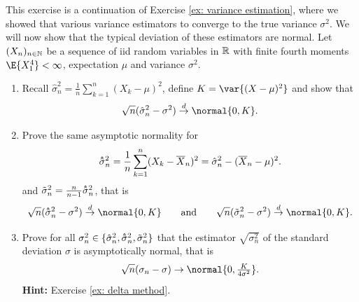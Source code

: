 
\begin{exercise}[subtitle={Normality of variance estimation \Coffeecup \Coffeecup}]
    This exercise is a continuation of Exercise \ref{ex: variance estimation},
    where we showed that various variance estimators to converge
    to the true variance \(\sigma^2\). We will now show that the typical
    deviation of these estimators are normal.
    Let \((X_n)_{n\in \mathbb{N}}\) be a sequence of iid random variables in \(\mathbb{R}\)
    with finite fourth moments \(\E{X_1^4} < \infty\), expectation \(\mu\) and variance \(\sigma^2\).
    \begin{enumerate}[label=(\alph*), noitemsep]
        \item\label{it: (normality of variance estimation) theoretical estimator}
        Recall \(\hat\sigma_n^2 = \frac1n \sum_{k=1}^n (X_k - \mu)^2\), define \(K = \var{(X-\mu)^2}\) and show that
        \[
            \sqrt{n}(\hat\sigma_n^2 - \sigma^2) \overset{d}\to \normal{0, K}.
        \]

        \item\label{it: (normality of variance estimation) realistic estimator}
        Prove the same asymptotic normality for
        \[
            \hhat{\sigma}_n^2
            = \frac1n \sum_{k=1}^n (X_k - \mean{X}_n)^2
            = \hat\sigma_n^2 - (\mean{X}_n - \mu)^2.
        \]
        and \(\tilde \sigma_n^2 = \frac{n}{n-1} \hhat{\sigma}_n^2\),
        that is
        \[
            \sqrt{n}(\hhat{\sigma}_n^2 - \sigma^2) \overset{d}\to \normal{0, K}
            \qquad\text{and}\qquad
            \sqrt{n}(\tilde\sigma_n^2 - \sigma^2) \overset{d}\to \normal{0, K}.
        \]

        \item\label{it: (normality of variance estimation) standard deviation}
        Prove for all \(\sigma_n^2 \in \set{\hat\sigma_n^2, \hhat{\sigma}_n^2, \tilde\sigma_n^2}\) that
        the estimator \(\sqrt{\sigma_n^2}\) of the standard deviation \(\sigma\) is asymptotically normal, that
        is
        \[
            \sqrt{n}(\sigma_n - \sigma)
            \to \normal{0, \tfrac{K}{4\sigma^2}}.
        \]
        \textbf{Hint:} Exercise \ref{ex: delta method}.
    \end{enumerate}
\end{exercise}
